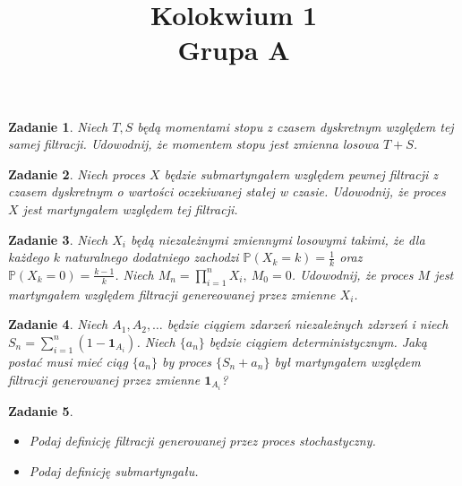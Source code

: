 \documentclass{mwart}
\title{Kolokwium 1\\Grupa A}
\newtheorem{zd}{Zadanie}
\begin{document}

\maketitle
\begin{zd}
Niech $T, S$ będą momentami stopu z czasem dyskretnym względem tej samej filtracji. Udowodnij, że momentem stopu jest zmienna losowa $T + S$.
\end{zd}
\begin{zd}
Niech proces $X$ będzie submartyngałem względem pewnej filtracji z czasem dyskretnym o wartości oczekiwanej stałej w czasie. Udowodnij, że proces $X$ jest martyngałem względem tej filtracji.
\end{zd}
\begin{zd}
Niech $X_i$ będą niezależnymi zmiennymi losowymi takimi, że dla każdego $k$ naturalnego dodatniego zachodzi $\mathbb{P}(X_k=k)=\frac{1}{k}$ oraz $\mathbb{P}(X_k = 0)= \frac{k-1}{k}$. Niech $M_n = \prod_{i=1}^nX_i,\ M_0=0$. Udowodnij, że proces $M$ jest martyngałem względem filtracji genereowanej przez zmienne $X_i$.
\end{zd}
\begin{zd}
Niech $A_1, A_2, \dots$ będzie ciągiem zdarzeń niezależnych zdzrzeń i niech $S_n = \sum_{i =1}^n(1-\pmb{1}_{A_i})$. Niech $\{a_n\}$ będzie ciągiem deterministycznym. Jaką postać musi mieć ciąg $\{a_n\}$ by proces $\{S_n + a_n\}$ był martyngałem względem filtracji generowanej przez zmienne $\pmb{1}_{A_i}$?
\end{zd}
\begin{zd}
\begin{itemize}
\item Podaj definicję filtracji generowanej przez proces stochastyczny.
\item Podaj definicję submartyngału.
\end{itemize}
\end{zd}
\end{document}

